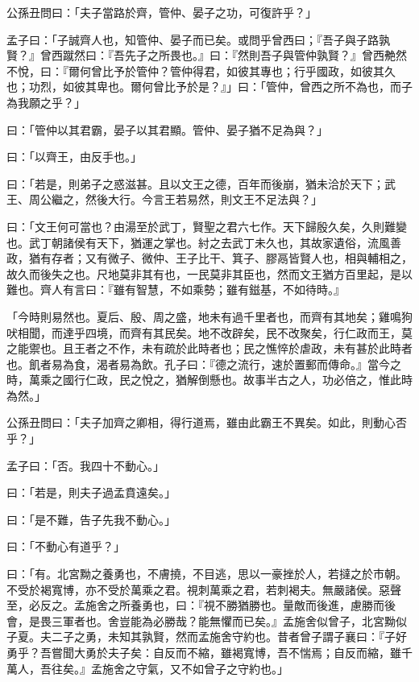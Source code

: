 
\begin{pinyinscope}
公孫丑問曰：「夫子當路於齊，管仲、晏子之功，可復許乎？」

孟子曰：「子誠齊人也，知管仲、晏子而已矣。或問乎曾西曰；『吾子與子路孰賢？』曾西蹴然曰：『吾先子之所畏也。』曰：『然則吾子與管仲孰賢？』曾西艴然不悅，曰：『爾何曾比予於管仲？管仲得君，如彼其專也；行乎國政，如彼其久也；功烈，如彼其卑也。爾何曾比予於是？』」曰：「管仲，曾西之所不為也，而子為我願之乎？」

曰：「管仲以其君霸，晏子以其君顯。管仲、晏子猶不足為與？」

曰：「以齊王，由反手也。」

曰：「若是，則弟子之惑滋甚。且以文王之德，百年而後崩，猶未洽於天下；武王、周公繼之，然後大行。今言王若易然，則文王不足法與？」

曰：「文王何可當也？由湯至於武丁，賢聖之君六七作。天下歸殷久矣，久則難變也。武丁朝諸侯有天下，猶運之掌也。紂之去武丁未久也，其故家遺俗，流風善政，猶有存者；又有微子、微仲、王子比干、箕子、膠鬲皆賢人也，相與輔相之，故久而後失之也。尺地莫非其有也，一民莫非其臣也，然而文王猶方百里起，是以難也。齊人有言曰：『雖有智慧，不如乘勢；雖有鎡基，不如待時。』

「今時則易然也。夏后、殷、周之盛，地未有過千里者也，而齊有其地矣；雞鳴狗吠相聞，而達乎四境，而齊有其民矣。地不改辟矣，民不改聚矣，行仁政而王，莫之能禦也。且王者之不作，未有疏於此時者也；民之憔悴於虐政，未有甚於此時者也。飢者易為食，渴者易為飲。孔子曰：『德之流行，速於置郵而傳命。』當今之時，萬乘之國行仁政，民之悅之，猶解倒懸也。故事半古之人，功必倍之，惟此時為然。」

公孫丑問曰：「夫子加齊之卿相，得行道焉，雖由此霸王不異矣。如此，則動心否乎？」

孟子曰：「否。我四十不動心。」

曰：「若是，則夫子過孟賁遠矣。」

曰：「是不難，告子先我不動心。」

曰：「不動心有道乎？」

曰：「有。北宮黝之養勇也，不膚撓，不目逃，思以一豪挫於人，若撻之於市朝。不受於褐寬博，亦不受於萬乘之君。視刺萬乘之君，若刺褐夫。無嚴諸侯。惡聲至，必反之。孟施舍之所養勇也，曰：『視不勝猶勝也。量敵而後進，慮勝而後會，是畏三軍者也。舍豈能為必勝哉？能無懼而已矣。』孟施舍似曾子，北宮黝似子夏。夫二子之勇，未知其孰賢，然而孟施舍守約也。昔者曾子謂子襄曰：『子好勇乎？吾嘗聞大勇於夫子矣：自反而不縮，雖褐寬博，吾不惴焉；自反而縮，雖千萬人，吾往矣。』孟施舍之守氣，又不如曾子之守約也。」


\end{pinyinscope}
